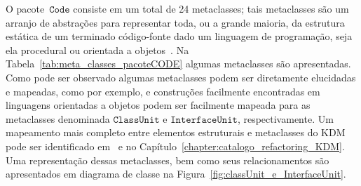 
O pacote~$\mathtt{Code}$ consiste em um total de 24 metaclasses; tais metaclasses são um arranjo de abstrações para representar toda, ou a grande maioria, da estrutura estática de um terminado código-fonte dado um linguagem de programação, seja ela procedural ou orientada a objetos~\cite{KDM:specification}. Na Tabela~\ref{tab:meta_classes_pacoteCODE} algumas metaclasses são apresentadas. Como pode ser observado algumas metaclasses podem ser diretamente elucidadas e mapeadas, como por exemplo,  e  construções facilmente encontradas em linguagens orientadas a objetos podem ser facilmente mapeada para as metaclasses denominada $\mathtt{ClassUnit}$ e $\mathtt{InterfaceUnit}$, respectivamente. Um mapeamento mais completo entre elementos estruturais e metaclasses do KDM pode ser identificado em~ e no Capítulo~\ref{chapter:catalogo_refactoring_KDM}. Uma representação dessas metaclasses, bem como seus relacionamentos são apresentados em diagrama de classe na Figura~\ref{fig:classUnit_e_InterfaceUnit}.

